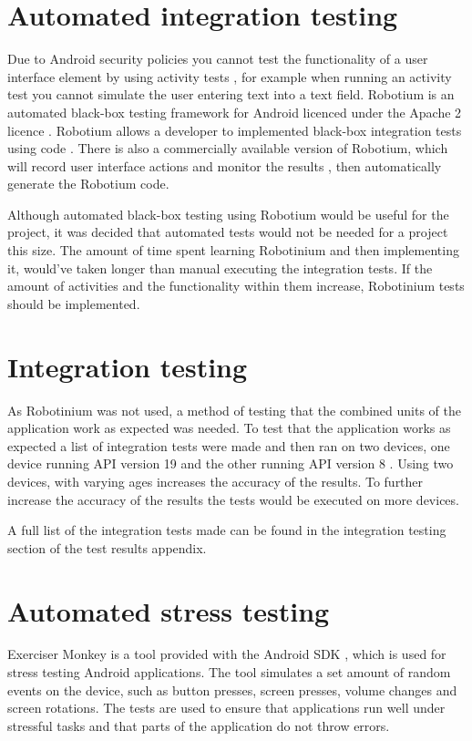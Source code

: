 \section{Automated integration testing}

Due to Android security policies you cannot test the functionality of a user interface element by using activity tests \cite{activity_test}, for example when running an activity test you cannot simulate the user entering text into a text field. Robotium is an automated black-box testing framework \cite{robotium} for Android licenced under the Apache 2 licence \cite{apache_licence}. Robotium allows a developer to implemented black-box integration tests using code \cite{robotium}. There is also a commercially available version of Robotium, which will record user interface actions and monitor the results \cite{robotium}, then automatically generate the Robotium code.

Although automated black-box testing using Robotium would be useful for the project, it was decided that automated tests would not be needed for a project this size. The amount of time spent learning Robotinium and then implementing it, would've taken longer than manual executing the integration tests. If the amount of activities and the functionality within them increase, Robotinium tests should be implemented.


\section{Integration testing}

As Robotinium was not used, a method of testing that the combined units of the application work as expected was needed. To test that the application works as expected a list of integration tests were made and then ran on two devices, one device running API version 19 and the other running API version 8 \cite{froyo}. Using two devices, with varying ages increases the accuracy of the results. To further increase the accuracy of the results the tests would be executed on more devices.

A full list of the integration tests made can be found in the integration testing section of the test results appendix.

\section{Automated stress testing}

Exerciser Monkey \cite{exciser} is a tool provided with the Android SDK \cite{android_sdk}, which is used for stress testing Android applications. The tool simulates a set amount of random events on the device, such as button presses, screen presses, volume changes and screen rotations. The tests are used to ensure that applications run well under stressful tasks and that parts of the application do not throw errors.

